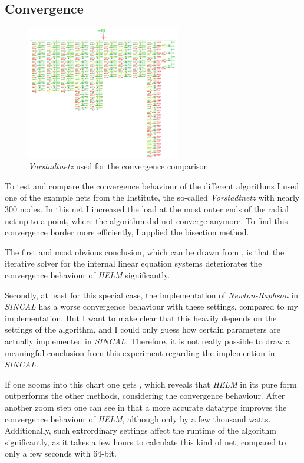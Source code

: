 \newpage

\subsection{Convergence}

\begin{figure}
	\centering
	\includegraphics[width=0.6\textwidth]{figures/vorstadtnetz}
	\caption[\emph{Vorstadtnetz}]{\emph{Vorstadtnetz} used for the convergence comparison}
	\label{fig:vorstadtnetz}
\end{figure}

To test and compare the convergence behaviour of the different algorithms I used one of the example nets from the Institute, the so-called \emph{Vorstadtnetz}  with nearly 300 nodes. In this net I increased the load at the most outer ends of the radial net up to a point, where the algorithm did not converge anymore. To find this convergence border more efficiently, I applied the bisection method.

The first and most obvious conclusion, which can be drawn from , is that the iterative solver for the internal linear equation systems deteriorates the convergence behaviour of \emph{HELM} significantly. 

Secondly, at least for this special case, the implementation of \emph{Newton-Raphson} in \emph{SINCAL} has a worse convergence behaviour with these settings, compared to my implementation. But I want to make clear that this heavily depends on the settings of the algorithm, and I could only guess how certain parameters are actually implemented in \emph{SINCAL}. Therefore, it is not really possible to draw a meaningful conclusion from this experiment regarding the implemention in \emph{SINCAL}.

If one zooms into this chart one gets , which reveals that \emph{HELM} in its pure form outperforms the other methods, considering the convergence behaviour. After another zoom step one can see in  that a more accurate datatype improves the convergence behaviour of \emph{HELM}, although only by a few thousand watts. Additionally, such extrordinary settings affect the runtime of the algorithm significantly, as it takes a few hours to calculate this kind of net, compared to only a few seconds with 64-bit.

